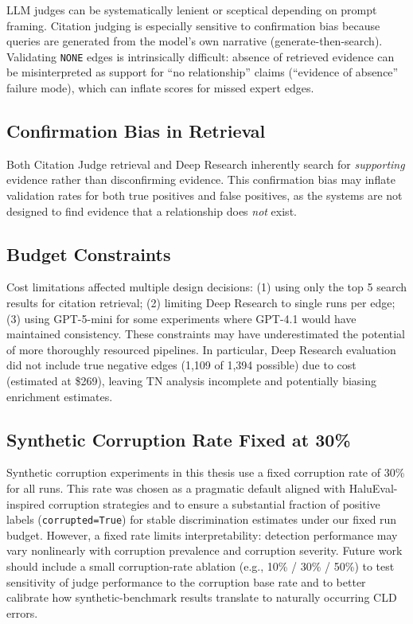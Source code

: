 LLM judges can be systematically lenient or sceptical depending on prompt framing. Citation judging is especially sensitive to confirmation bias because queries are generated from the model's own narrative (generate-then-search). Validating \texttt{NONE} edges is intrinsically difficult: absence of retrieved evidence can be misinterpreted as support for ``no relationship'' claims (``evidence of absence'' failure mode), which can inflate scores for missed expert edges.

\subsection{Confirmation Bias in Retrieval}

Both Citation Judge retrieval and Deep Research 
inherently search for \textit{supporting} 
evidence rather than disconfirming evidence. This 
confirmation bias may inflate validation rates 
for both true positives and false positives, as 
the systems are not designed to find evidence 
that a relationship does \textit{not} exist.

\subsection{Budget Constraints}

Cost limitations affected multiple design decisions: (1) using only the top 5 search results for citation retrieval; (2) limiting Deep Research to single runs per edge; (3) using GPT-5-mini for some experiments where GPT-4.1 would have maintained consistency. These constraints may have underestimated the potential of more thoroughly resourced pipelines.
In particular, Deep Research evaluation did not include true negative edges (1,109 of 1,394 possible) due to cost (estimated at \$269), leaving TN analysis incomplete and potentially biasing enrichment estimates.






\subsection{Synthetic Corruption Rate Fixed at 30\%}
Synthetic corruption experiments in this thesis use a fixed corruption rate of 30\% for all runs. This rate was chosen as a pragmatic default aligned with HaluEval-inspired corruption strategies and to ensure a substantial fraction of positive labels (\texttt{corrupted=True}) for stable discrimination estimates under our fixed run budget. However, a fixed rate limits interpretability: detection performance may vary nonlinearly with corruption prevalence and corruption severity. Future work should include a small corruption-rate ablation (e.g., 10\% / 30\% / 50\%) to test sensitivity of judge performance to the corruption base rate and to better calibrate how synthetic-benchmark results translate to naturally occurring CLD errors.


